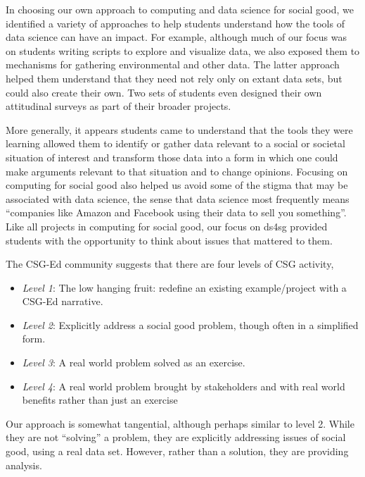 In choosing our own approach to computing and data science for
social good, we identified a variety of approaches to help students
understand how the tools of data science can have an impact.  For
example, although much of our focus was on students writing scripts
to explore and visualize data, we also exposed them to mechanisms
for gathering environmental and other data.  The latter approach
helped them understand that they need not rely only on extant data
sets, but could also create their own.  Two sets of students even
designed their own attitudinal surveys as part of their broader
projects.

More generally, it appears students came to understand that the
tools they were learning allowed them to identify or gather data
relevant to a social or societal situation of interest and transform
those data into a form in which one could make arguments relevant
to that situation and to change opinions.  Focusing on computing
for social good also helped us avoid some of the stigma that may
be associated with data science, the sense that data science most
frequently means ``companies like Amazon and Facebook using their
data to sell you something''.  Like all projects in computing for
social good, our focus on ds4sg provided students with the opportunity
to think about issues that mattered to them.

The CSG-Ed community suggests that there are four levels of CSG
activity,\cite{Goldweber2018}

\begin{itemize}
\item \textit{Level 1}: The low hanging fruit: redefine an existing
  example/project with a CSG-Ed narrative.
\item \textit{Level 2}: Explicitly address a social good problem,
  though often in a simplified form.
\item \textit{Level 3}: A real world problem solved as an
  exercise.
\item \textit{Level 4}: A real world problem brought by stakeholders
  and with real world benefits rather than just an exercise
\end{itemize}

Our approach is somewhat tangential, although perhaps similar to
level 2.  While they are not ``solving'' a problem, they are
explicitly addressing issues of social good, using a real data set.
However, rather than a solution, they are providing analysis.



